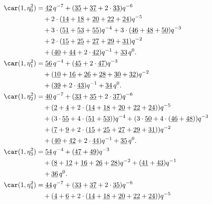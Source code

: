 \begin{align*}
	\car(1,\eta^{2}_{0})
	&=\underline{42}\,q^{-7}+(\underline{35}+\underline{37}+2\cdot\underline{33})q^{-6}\\
	&\quad+2\cdot(\underline{14}+\underline{18}+\underline{20}+\underline{22}+\underline{24})q^{-5}\\
	&\quad+3\cdot(\underline{51}+\underline{53}+\underline{55})q^{-4}+3\cdot(\underline{46}+\underline{48}+\underline{50})q^{-3}\\
	&\quad+2\cdot(\underline{15}+\underline{25}+\underline{27}+\underline{29}+\underline{31})q^{-2}\\
	&\quad+(\underline{40}+\underline{44}+2\cdot\underline{42})q^{-1}+\underline{33}\,q^0.\\
	\car(1,\eta^{2}_{1})
	&=\underline{56}\,q^{-4}+(\underline{45}+2\cdot\underline{47})q^{-3}\\
	&\quad+(\underline{10}+\underline{16}+\underline{26}+\underline{28}+\underline{30}+\underline{32})q^{-2}\\
	&\quad+(\underline{39}+2\cdot\underline{43})q^{-1}+\underline{34}\,q^0.\\
	\car(1,\eta^{2}_{2})
	&=\underline{40}\,q^{-7}+(\underline{33}+\underline{35}+2\cdot\underline{37})q^{-6}\\
	&\quad+(\underline{2}+\underline{4}+2\cdot(\underline{14}+\underline{18}+\underline{20}+\underline{22}+\underline{24}))q^{-5}\\
	&\quad+(3\cdot\underline{55}+4\cdot(\underline{51}+\underline{53}))q^{-4}+(3\cdot\underline{50}+4\cdot(\underline{46}+\underline{48}))q^{-3}\\
	&\quad+(\underline{7}+\underline{9}+2\cdot(\underline{15}+\underline{25}+\underline{27}+\underline{29}+\underline{31}))q^{-2}\\
	&\quad+(\underline{40}+\underline{42}+2\cdot\underline{44})q^{-1}+\underline{35}\,q^0.\\
	\car(1,\eta^{2}_{3})
	&=\underline{54}\,q^{-4}+(\underline{47}+\underline{49})q^{-3}\\
	&\quad+(\underline{8}+\underline{12}+\underline{16}+\underline{26}+\underline{28})q^{-2}+(\underline{41}+\underline{43})q^{-1}\\
	&\quad+\underline{36}\,q^0.\\
	\car(1,\eta^{2}_{4})
	&=\underline{44}\,q^{-7}+(\underline{33}+\underline{37}+2\cdot\underline{35})q^{-6}\\
	&\quad+(\underline{4}+\underline{6}+2\cdot(\underline{14}+\underline{18}+\underline{20}+\underline{22}+\underline{24}))q^{-5}\\

\end{align*}
